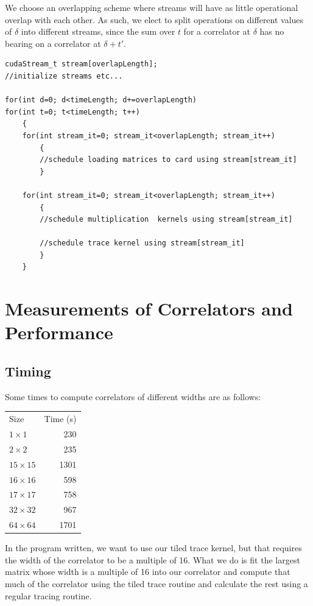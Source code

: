 \documentclass[a4paper,12pt]{report}
\begin{document}
We choose an overlapping scheme where streams will have as little operational overlap with each other.
As such, we elect to split operations on different values of $\delta$ into different streams, since the sum over $t$ for a correlator at $\delta$ has no bearing on a correlator at $\delta+t'$.

\begin{lstlisting}[caption=An Approach To Overlapping]
cudaStream_t stream[overlapLength];
//initialize streams etc...

for(int d=0; d<timeLength; d+=overlapLength)
for(int t=0; t<timeLength; t++)
	{
	for(int stream_it=0; stream_it<overlapLength; stream_it++)
		{
		//schedule loading matrices to card using stream[stream_it]
		}
	
	for(int stream_it=0; stream_it<overlapLength; stream_it++)
		{
		//schedule multiplication  kernels using stream[stream_it]
		
		//schedule trace kernel using stream[stream_it]
		}
	}
\end{lstlisting}





\chapter{Measurements of Correlators and Performance}
\section{Timing}
Some times to compute correlators of different widths are as follows:

\begin{center}
\begin{tabular}{l | r}
Size & Time (s)\\
$1 \times 1$ & 230\\
$2 \times 2$ & 235\\
$15 \times 15$ & 1301\\
$16 \times 16$ & 598\\
$17 \times 17$ & 758\\
$32 \times 32$ & 967\\
$64 \times 64$ & 1701
\end{tabular}
\end{center}

In the program written, we want to use our tiled trace kernel, but that requires the width of the correlator to be a multiple of 16.
What we do is fit the largest matrix whose width is a multiple of 16 into our correlator and compute that much of the correlator using the tiled trace routine and calculate the rest using a regular tracing routine.
\end{document}
